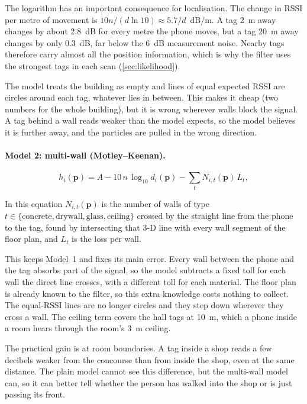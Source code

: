 \documentclass[11pt,a4paper]{article}
\begin{document}
The logarithm has an important consequence for localisation. The change in RSSI per
metre of movement is $10n/(d \ln 10) \approx 5.7/d$~dB/m. A tag \SI{2}{m} away changes by
about \SI{2.8}{dB} for every metre the phone moves, but a tag \SI{20}{m} away changes by
only \SI{0.3}{dB}, far below the \SI{6}{dB} measurement noise. Nearby tags therefore
carry almost all the position information, which is why the filter uses the strongest
tags in each scan (\cref{sec:likelihood}).

The model treats the building as empty and lines of equal expected RSSI are circles around
each tag, whatever lies in between. This makes it cheap (two numbers for the whole
building), but it is wrong wherever walls block the signal. A tag behind a wall reads
weaker than the model expects, so the model believes it is further away, and the
particles are pulled in the wrong direction.

\paragraph{Model 2: multi-wall (Motley--Keenan).}
\begin{equation}
  h_i(\mathbf{p}) = A - 10\,n\,\log_{10} d_i(\mathbf{p}) - \sum_{t} N_{i,t}(\mathbf{p})\,L_t,
  \label{eq:multiwall}
\end{equation}

In this equation $N_{i,t}(\mathbf{p})$ is the number of walls of type
$t\in\{\text{concrete},\text{drywall},\text{glass},\text{ceiling}\}$ crossed by the
straight line from the phone to the tag, found by intersecting that 3-D line with every
wall segment of the floor plan, and $L_t$ is the loss per wall.

This keeps Model~1 and fixes its main error. Every wall between the phone and
the tag absorbs part of the signal, so the model subtracts a fixed toll for each wall
the direct line crosses, with a different toll for each material. The floor plan is
already known to the filter, so this extra knowledge costs nothing to collect. The equal-RSSI lines are no longer circles and they step down
wherever they cross a wall. The ceiling term covers the hall tags at \SI{10}{m}, which a
phone inside a room hears through the room's \SI{3}{m} ceiling.

The practical gain is at room boundaries. A tag inside a shop reads a few decibels
weaker from the concourse than from inside the shop, even at the same distance. The
plain model cannot see this difference, but the multi-wall model can, so it can better
tell whether the person has walked into the shop or is just passing its front.
\end{document}
